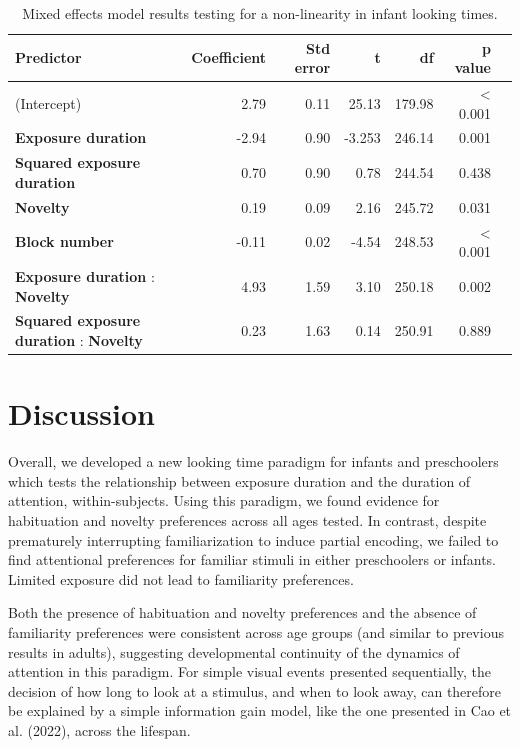 \documentclass[10pt, letterpaper]{article}
\begin{document}
\begin{table}[t]
\centering
\begin{tabular}{lrrrrrr}
  \hline
 Predictor & Coefficient & Std error & t & df & p value \\ 
  \hline
(Intercept) & 2.79 & 0.11 & 25.13 & 179.98 & \textless{ 0.001} \\ 
  \textbf{Exposure duration} & -2.94 & 0.90 & -3.253 & 246.14 & 0.001 \\ 
  \textbf{Squared exposure duration} & 0.70 & 0.90 & 0.78 & 244.54 & 0.438 \\ 
  \textbf{Novelty} & 0.19 & 0.09 & 2.16 & 245.72 & 0.031 \\ 
  \textbf{Block number} & -0.11 & 0.02 & -4.54 & 248.53 & \textless{ 0.001} \\ 
  \textbf{Exposure duration} : \textbf{Novelty} & 4.93 & 1.59 & 3.10 & 250.18 & 0.002 \\ 
  \textbf{Squared exposure duration} : \textbf{Novelty} & 0.23 & 1.63 & 0.14 & 250.91 & 0.889 \\ 
   \hline
\end{tabular}
\caption{Mixed effects model results testing for a non-linearity in infant looking times.}\label{wrap-tab:1}
\end{table}

\hypertarget{discussion}{%
\section{Discussion}\label{discussion}}

Overall, we developed a new looking time paradigm for infants and
preschoolers which tests the relationship between exposure duration and
the duration of attention, within-subjects. Using this paradigm, we
found evidence for habituation and novelty preferences across all ages
tested. In contrast, despite prematurely interrupting familiarization to
induce partial encoding, we failed to find attentional preferences for
familiar stimuli in either preschoolers or infants. Limited exposure did
not lead to familiarity preferences.

Both the presence of habituation and novelty preferences and the absence
of familiarity preferences were consistent across age groups (and
similar to previous results in adults), suggesting developmental
continuity of the dynamics of attention in this paradigm. For simple
visual events presented sequentially, the decision of how long to look
at a stimulus, and when to look away, can therefore be explained by a
simple information gain model, like the one presented in Cao et al.
(2022), across the lifespan.
\end{document}
